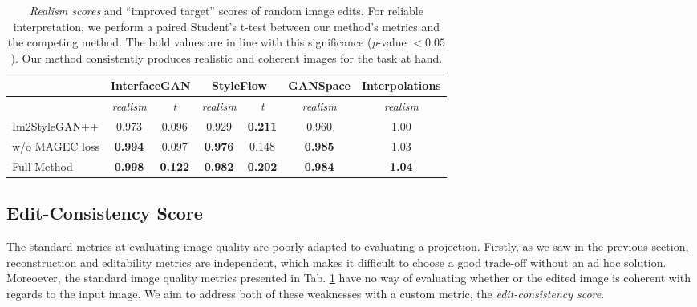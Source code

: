 

\begin{table}
\centering
\begin{tabular}{|l|c|c|c|c|c|c|}
\hline
               & \multicolumn{2}{c|}{ InterfaceGAN} & \multicolumn{2}{c|}{ StyleFlow} &  GANSpace &  Interpolations \\ \hline
               &  \textit{realism}      &  \textit{t}         &  \textit{realism}    &  \textit{t}        &  \textit{realism}  &  \textit{realism}        \\ \hline
 Im2StyleGAN++  &  0.973                 &  0.096     &  0.929               &  \textbf{0.211}    &  0.960             &  1.00           \\ \hline
 w/o MAGEC loss &  \textbf{0.994}        &  0.097              &  \textbf{0.976}      &  0.148             &  \textbf{0.985}    &  1.03                    \\ \hline
 Full Method    &  \textbf{0.998}        &  \textbf{0.122}     &  \textbf{0.982}      &  \textbf{0.202}    &  \textbf{0.984}    &  \textbf{1.04}           \\ \hline
\end{tabular}\caption{ \emph{Realism scores} and ``improved target'' scores of random image edits. For reliable interpretation, we perform a paired Student's t-test between our method's metrics and the competing method. The bold values are in line with this significance (\emph{p}-value $< 0.05$). Our method consistently produces realistic and coherent images for the task at hand.}\label{tab:standard_metrics}
\end{table}




\subsection{Edit-Consistency Score}

The standard metrics at evaluating image quality are poorly adapted to evaluating a 
projection. Firstly, as we saw in the previous section, reconstruction and editability 
metrics are independent, which makes it difficult to choose a good trade-off without an 
ad hoc solution. Moreoever, the standard image quality metrics presented in Tab. \ref{tab:standard_metrics}
have no way of evaluating whether or the edited image is coherent with regards to the input image. 
We aim to address both of these weaknesses with a custom metric, the \emph{edit-consistency score}.
 

